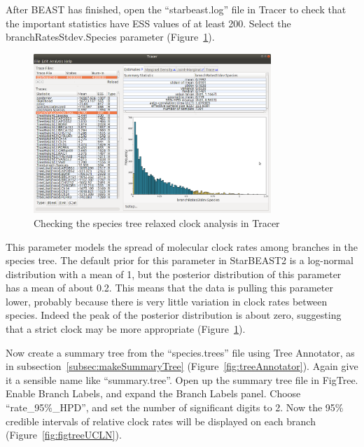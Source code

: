 \documentclass[12pt]{article}
\begin{document}
After BEAST has finished, open the ``starbeast.log'' file in Tracer to
check that the important statistics have ESS values of at least 200.
Select the branchRatesStdev.Species parameter (Figure~\ref{fig:tracerUCLN}).

\begin{figure}[htb!]
\centering
\includegraphics[width=0.8\textwidth]{figures/tracerUCLN.png}
\caption
{Checking the species tree relaxed clock analysis in Tracer}
\label{fig:tracerUCLN}
\end{figure}

This parameter models the spread of molecular clock rates among branches in
the species tree. The default prior for this parameter in StarBEAST2 is a
log-normal distribution with a mean of 1, but the posterior distribution of this
parameter has a mean of about 0.2. This means that the data is pulling this
parameter lower, probably because there is very little variation in clock
rates between species. Indeed the peak of the posterior distribution is about
zero, suggesting that a strict clock may be more appropriate
(Figure~\ref{fig:tracerUCLN}).

Now create a summary tree from the ``species.trees'' file using Tree
Annotator, as in subsection~\ref{subsec:makeSummaryTree}
(Figure~\ref{fig:treeAnnotator}). Again give it a sensible name like
``summary.tree''. Open up the summary tree file in FigTree. Enable Branch Labels,
and expand the Branch Labels panel. Choose ``rate\_95\%\_HPD'', and set
the number of significant digits to 2. Now the 95\% credible intervals of
relative clock rates will be displayed on each branch
(Figure~\ref{fig:figtreeUCLN}).
\end{document}
